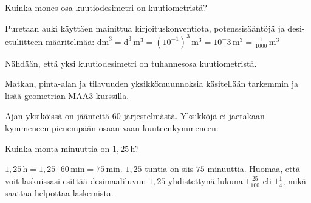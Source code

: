 \begin{esimerkki}

Kuinka mones osa kuutiodesimetri on kuutiometristä?

	\begin{esimratk}
	Puretaan auki käyttäen mainittua kirjoituskonventiota, potenssisääntöjä ja desi-etuliitteen määritelmää: $\text{dm}^3=\text{d}^3\,\text{m}^3=(10^{-1})^3\,\text{m}^3=10^-3\,\text{m}^3=\frac{1}{1000}\,\text{m}^3$
	
	Nähdään, että yksi kuutiodesimetri on tuhannesosa kuutiometristä.
	\end{esimratk}

\end{esimerkki}







Matkan, pinta-alan ja tilavuuden yksikkömuunnoksia käsitellään tarkemmin ja lisää geometrian MAA3-kurssilla. 

Ajan yksiköissä on jäänteitä 60-järjestelmästä. Yksikköjä ei jaetakaan kymmeneen pienempään osaan vaan kuuteenkymmeneen:


%
%
%
%

\begin{esimerkki}
Kuinka monta minuuttia on $1,25$\,h?

\begin{esimratk}
$1,25\,\text{h} = 1,25 \cdot 60\,\text{min} = 75\,\text{min}$. $1,25$ tuntia on siis $75$ minuuttia. Huomaa, että voit laskuissasi esittää desimaaliluvun $1,25$ yhdistettynä lukuna $1 \frac{25}{100}$ eli $1 \frac{1}{4}$, mikä saattaa helpottaa laskemista.
\end{esimratk}
\end{esimerkki}

